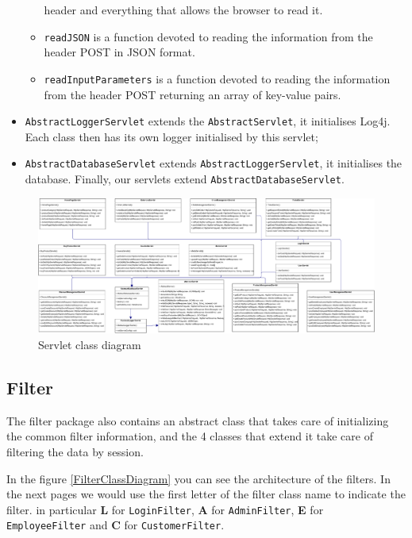 \begin{itemize}
\begin{itemize}
        header and everything that allows the browser to read it.
        \item \texttt{readJSON}  is a function devoted to reading the information 
        from the header POST in JSON format.
        \item \texttt{readInputParameters} is a function devoted to reading the 
        information from the header POST returning an array of key-value pairs.
    \end{itemize}
    \item \texttt{AbstractLoggerServlet} extends the \texttt{AbstractServlet}, it initialises Log4j. 
    Each class then has its own logger initialised by this servlet;
    \item \texttt{AbstractDatabaseServlet} extends \texttt{AbstractLoggerServlet}, it initialises the database.
    Finally, our servlets extend \texttt{AbstractDatabaseServlet}.
\end{itemize}    


\begin{figure}[H]
    \includegraphics[width=\textwidth,height=\textheight,keepaspectratio]{Schemas/servlet.drawio.pdf}
    \caption{Servlet class diagram}
    \label{fig:ServletClassDiagram}
\end{figure}

\subsection*{Filter}

    
The filter package also contains an abstract class that takes care of 
initializing the common filter information, and the 4 classes that 
extend it take care of filtering the data by session.

In the figure \ref{FilterClassDiagram} you can see the architecture 
of the filters. In the next pages we would use
the first letter of the filter class name to indicate the filter.
in particular \textbf{L} for \texttt{LoginFilter}, 
\textbf{A} for \texttt{AdminFilter}, \textbf{E} for 
\texttt{EmployeeFilter} and \textbf{C} for \texttt{CustomerFilter}.

